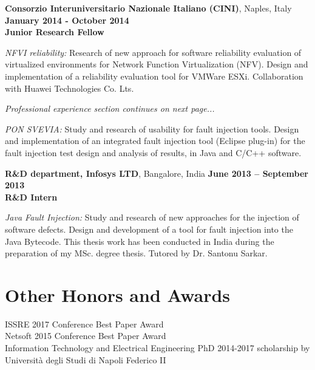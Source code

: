 \documentclass[margin,line]{resume}
\begin{document}
\begin{resume}
\textbf{Consorzio Interuniversitario Nazionale Italiano (CINI)}, Naples, Italy\\
\null\hfill\textbf{January 2014 - October 2014}\\
\textbf{Junior Research Fellow}\hfill 
\vspace{-3mm}\\\vspace{-1mm}
\begin{list2}
	\item \filbreak\textit{NFVI reliability:} Research of new approach for software reliability evaluation of virtualized environments for Network Function Virtualization (NFV). Design and implementation of a reliability evaluation tool for VMWare ESXi. Collaboration with Huawei Technologies Co. Lts.
	\item[] \item[] \hfill \textit{Professional experience section continues on next page...}
	\item \filbreak\textit{PON SVEVIA:} Study and research of usability for fault injection tools. Design and implementation of an integrated fault injection tool (Eclipse plug-in) for the fault injection test design and analysis of results, in Java and C/C++ software.
\end{list2}

\filbreak
\textbf{R\&D department, Infosys LTD}, Bangalore, India\hfill
\textbf{June 2013 -- September 2013}\\
\textbf{R\&D Intern}\hfill 
\vspace{-3mm}\\\vspace{-1mm}
\begin{list2}
    \item \filbreak\textit{Java Fault Injection:} Study and research of new approaches for the injection of software defects. Design and development of a tool for fault injection into the Java Bytecode. This thesis work has been conducted in India during the preparation of my MSc. degree thesis. Tutored by Dr. Santonu Sarkar.
\end{list2}

\section{\mysidestyle Other Honors and Awards}
ISSRE 2017 Conference Best Paper Award
\vspace{1mm}\\%
Netsoft 2015 Conference Best Paper Award
\vspace{1mm}\\%
Information Technology and Electrical Engineering PhD 2014-2017 scholarship by Universit\`a degli Studi di Napoli Federico II


\end{resume}
\end{document}
